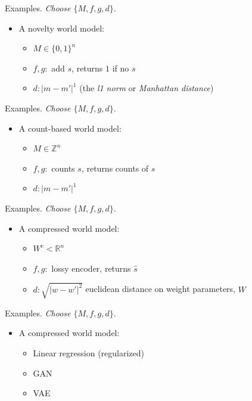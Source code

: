 \documentclass[10pt]{beamer}
\begin{document}
\begin{frame}[fragile]{Examples.}
\textit{Choose $\{M, f, g, d\}$}.
\begin{itemize}
    \item A novelty world model:
    \begin{itemize}
        \item $M \in \{0,1\}^n$
        \item $f,g: $ add $s$, returns $1$ if no $s$ 
        \item $d: |m - m'|^1$ (the \textit{l1 norm} or \textit{Manhattan distance})
    \end{itemize}
\end{itemize}
\end{frame}

\begin{frame}[fragile]{Examples.}
\textit{Choose $\{M, f, g, d\}$}.
\begin{itemize}
    \item A count-based world model:
    \begin{itemize}
        \item $M \in \mathbb{Z}^n$
        \item $f,g: $ counts $s$, returns counts of $s$
        \item $d: |m - m'|^1$ 
    \end{itemize}
\end{itemize}
\end{frame}

\begin{frame}[fragile]{Examples.}
\textit{Choose $\{M, f, g, d\}$}.
\begin{itemize}
    \item A compressed world model:
    \begin{itemize}
        \item $W^c < \mathbb{R}^n$
        \item $f,g: $ lossy encoder, returns $\hat s$
        \item $d: \sqrt{|w - w'|^2}$ euclidean distance on weight parameters, $W$
    \end{itemize}
\end{itemize}
\end{frame}

\begin{frame}[fragile]{Examples.}
\textit{Choose $\{M, f, g, d\}$}.
\begin{itemize}
    \item A compressed world model:
    \begin{itemize}
        \item Linear regression (regularized)
        \item GAN
        \item VAE
    \end{itemize}
\end{itemize}
\end{frame}
\end{document}
